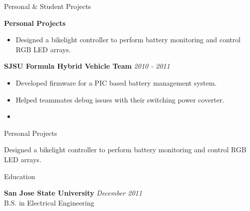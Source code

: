 \documentclass{resume} %
\begin{document}

\begin{rSection}{Personal \& Student Projects}

{\bf Personal Projects}
\begin{itemize}
\itemsep -0.5em \vspace{-0.5em}
\renewcommand{\labelitemi}{-}
\item Designed a bikelight controller to perform battery monitoring and control RGB LED arrays.
\end{itemize}

{\bf SJSU Formula Hybrid Vehicle Team} \hfill {\em 2010 - 2011}
\begin{itemize}
\itemsep -0.5em \vspace{-0.5em}
\renewcommand{\labelitemi}{-}
\item Developed firmware for a PIC based battery management system.
\item Helped teammates debug issues with their switching power coverter.
\item 
\end{itemize}

\begin{rProject}{Personal Projects}
\item Designed a bikelight controller to perform battery monitoring and control RGB LED arrays.

\end{rProject}


\end{rSection}


\begin{rSection}{Education}

{\bf San Jose State University} \hfill {\em December 2011} \\ 
B.S. in Electrical Engineering \\

\end{rSection}





\end{document}
